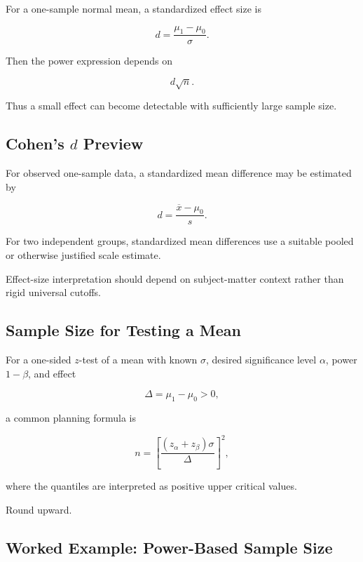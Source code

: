 For a one-sample normal mean, a standardized effect size is

\[
\boxed{
d
=
\frac{
\mu_1-\mu_0
}{
\sigma
}.
}
\]

Then the power expression depends on

\[
d\sqrt{n}.
\]

Thus a small effect can become detectable with sufficiently large
sample size.

\subsection{Cohen's \(d\) Preview}
\label{subsec:cohens-d-preview}

For observed one-sample data, a standardized mean difference may be
estimated by

\[
\boxed{
d
=
\frac{
\overline{x}-\mu_0
}{
s
}.
}
\]

For two independent groups, standardized mean differences use a suitable
pooled or otherwise justified scale estimate.

Effect-size interpretation should depend on subject-matter context rather
than rigid universal cutoffs.

\subsection{Sample Size for Testing a Mean}
\label{subsec:sample-size-testing-mean}

For a one-sided \(z\)-test of a mean with known \(\sigma\), desired
significance level \(\alpha\), power \(1-\beta\), and effect

\[
\Delta
=
\mu_1-\mu_0>0,
\]

a common planning formula is

\[
\boxed{
n
=
\left[
\frac{
(z_\alpha+z_\beta)\sigma
}{
\Delta
}
\right]^2,
}
\]

where the quantiles are interpreted as positive upper critical values.

Round upward.

\subsection{Worked Example: Power-Based Sample Size}
\label{subsec:worked-power-sample-size}

